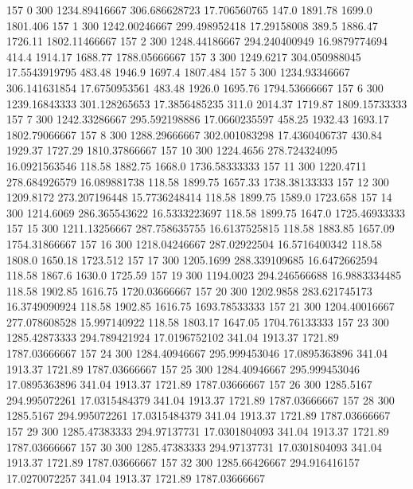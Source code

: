 157  0  300  1234.89416667  306.686628723  17.706560765  147.0  1891.78  1699.0  1801.406 
157  1  300  1242.00246667  299.498952418  17.29158008  389.5  1886.47  1726.11  1802.11466667 
157  2  300  1248.44186667  294.240400949  16.9879774694  414.4  1914.17  1688.77  1788.05666667 
157  3  300  1249.6217  304.050988045  17.5543919795  483.48  1946.9  1697.4  1807.484 
157  5  300  1234.93346667  306.141631854  17.6750953561  483.48  1926.0  1695.76  1794.53666667 
157  6  300  1239.16843333  301.128265653  17.3856485235  311.0  2014.37  1719.87  1809.15733333 
157  7  300  1242.33286667  295.592198886  17.0660235597  458.25  1932.43  1693.17  1802.79066667 
157  8  300  1288.29666667  302.001083298  17.4360406737  430.84  1929.37  1727.29  1810.37866667 
157  10  300  1224.4656  278.724324095  16.0921563546  118.58  1882.75  1668.0  1736.58333333 
157  11  300  1220.4711  278.684926579  16.089881738  118.58  1899.75  1657.33  1738.38133333 
157  12  300  1209.8172  273.207196448  15.7736248414  118.58  1899.75  1589.0  1723.658 
157  14  300  1214.6069  286.365543622  16.5333223697  118.58  1899.75  1647.0  1725.46933333 
157  15  300  1211.13256667  287.758635755  16.6137525815  118.58  1883.85  1657.09  1754.31866667 
157  16  300  1218.04246667  287.02922504  16.5716400342  118.58  1808.0  1650.18  1723.512 
157  17  300  1205.1699  288.339109685  16.6472662594  118.58  1867.6  1630.0  1725.59 
157  19  300  1194.0023  294.246566688  16.9883334485  118.58  1902.85  1616.75  1720.03666667 
157  20  300  1202.9858  283.621745173  16.3749090924  118.58  1902.85  1616.75  1693.78533333 
157  21  300  1204.40016667  277.078608528  15.997140922  118.58  1803.17  1647.05  1704.76133333 
157  23  300  1285.42873333  294.789421924  17.0196752102  341.04  1913.37  1721.89  1787.03666667 
157  24  300  1284.40946667  295.999453046  17.0895363896  341.04  1913.37  1721.89  1787.03666667 
157  25  300  1284.40946667  295.999453046  17.0895363896  341.04  1913.37  1721.89  1787.03666667 
157  26  300  1285.5167  294.995072261  17.0315484379  341.04  1913.37  1721.89  1787.03666667 
157  28  300  1285.5167  294.995072261  17.0315484379  341.04  1913.37  1721.89  1787.03666667 
157  29  300  1285.47383333  294.97137731  17.0301804093  341.04  1913.37  1721.89  1787.03666667 
157  30  300  1285.47383333  294.97137731  17.0301804093  341.04  1913.37  1721.89  1787.03666667 
157  32  300  1285.66426667  294.916416157  17.0270072257  341.04  1913.37  1721.89  1787.03666667 

